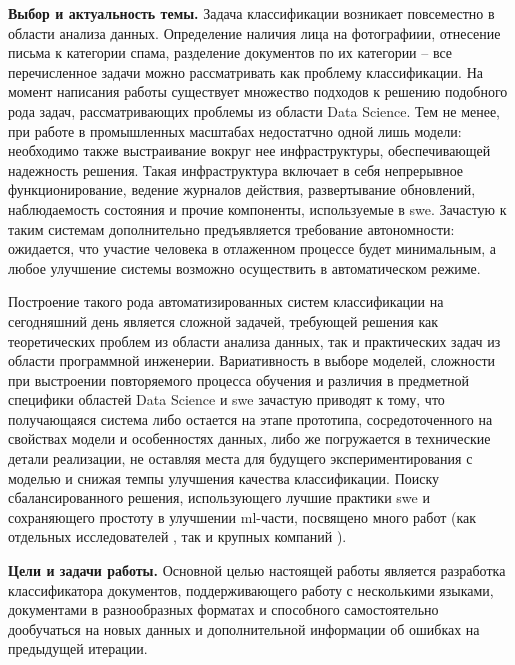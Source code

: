 
\intro

\textbf{Выбор и актуальность темы.} 
Задача классификации возникает повсеместно в области анализа данных.
Определение наличия лица на фотографиии, отнесение письма к категории спама, разделение документов по их категории -- все перечисленное задачи можно рассматривать как проблему классификации.
На момент написания работы существует множество подходов к решению подобного рода задач, рассматривающих проблемы из области Data Science.
Тем не менее, при работе в промышленных масштабах недостатчно одной лишь модели: необходимо также выстраивание вокруг нее инфраструктуры, обеспечивающей надежность решения.
Такая инфраструктура включает в себя непрерывное функционирование, ведение журналов действия, развертывание обновлений, наблюдаемость состояния и прочие компоненты, используемые в \gls{swe}.
Зачастую к таким системам дополнительно предъявляется требование автономности: ожидается, что участие человека в отлаженном процессе будет минимальным, а любое улучшение системы возможно осуществить в автоматическом режиме.

Построение такого рода автоматизированных систем классификации на сегодняшний день является сложной задачей, требующей решения как теоретических проблем из области анализа данных, так и практических задач из области программной инженерии.
Вариативность в выборе моделей, сложности при выстроении повторяемого процесса обучения и различия в предметной специфики областей Data Science и \gls{swe} зачастую приводят к тому, что получающаяся система либо остается на этапе прототипа, сосредоточенного на свойствах модели и особенностях данных, либо же погружается в технические детали реализации, не оставляя места для будущего экспериментирования с моделью и снижая темпы улучшения качества классификации.
Поиску сбалансированного решения, использующего лучшие практики \gls{swe} и сохраняющего простоту в улучшении \acrshort{ml}-части, посвящено много работ (как отдельных исследователей \cite{cite:ml-reproducibility}, так и крупных компаний \cite{cite:ml-debt}).

\textbf{Цели и задачи работы.}
Основной целью настоящей работы является разработка классификатора документов, поддерживающего работу с несколькими языками, документами в разнообразных форматах и способного самостоятельно дообучаться на новых данных и дополнительной информации об ошибках на предыдущей итерации.

